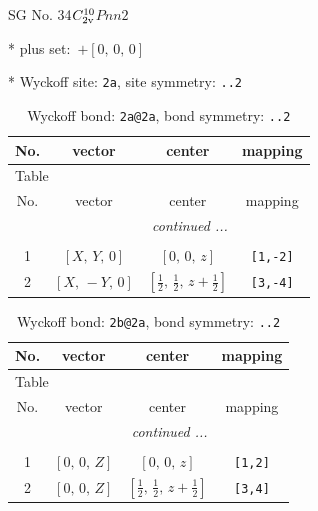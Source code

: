 \documentclass[fleqn,8pt]{jsarticle}
\begin{document}
\setcounter{MaxMatrixCols}{32}

\renewcommand{\tablename}{Table~}
\renewcommand{\figurename}{Figure~}
\begin{center}
\LARGE
SG No. 34\quad$C_{\rm 2v}^{10}$\quad$Pnn2$\quad[ orthorhombic ]
\end{center}

* plus set:\,\,\,$+\left[ 0,\, 0,\, 0 \right]$


* Wyckoff site: {\tt 2a}, site symmetry: {\tt ..2}
\renewcommand{\arraystretch}{1.2}
\begin{longtable}{cccc}
\caption{Wyckoff bond: {\tt 2a@2a}, bond symmetry: {\tt ..2}}
 \\
 \hline \hline
No. & vector & center & mapping \\ \hline \endfirsthead

\multicolumn{3}{l}{\tablename\ \thetable{}} \\
 \hline \hline
No. & vector & center & mapping \\ \hline \endhead

 \hline \hline
\multicolumn{3}{r}{\footnotesize\it continued ...} \\ \endfoot

 \hline \hline
\multicolumn{3}{r}{} \\ \endlastfoot

1 & $\left[ X,\, Y,\, 0 \right]$ & $\left[ 0,\, 0,\, z \right]$ & {\tt [1,-2]} \\ \hline
2 & $\left[ X,\, - Y,\, 0 \right]$ & $\left[ \frac{1}{2},\, \frac{1}{2},\, z + \frac{1}{2} \right]$ & {\tt [3,-4]} \\
\end{longtable}
\renewcommand{\arraystretch}{1.2}
\begin{longtable}{cccc}
\caption{Wyckoff bond: {\tt 2b@2a}, bond symmetry: {\tt ..2}}
 \\
 \hline \hline
No. & vector & center & mapping \\ \hline \endfirsthead

\multicolumn{3}{l}{\tablename\ \thetable{}} \\
 \hline \hline
No. & vector & center & mapping \\ \hline \endhead

 \hline \hline
\multicolumn{3}{r}{\footnotesize\it continued ...} \\ \endfoot

 \hline \hline
\multicolumn{3}{r}{} \\ \endlastfoot

1 & $\left[ 0,\, 0,\, Z \right]$ & $\left[ 0,\, 0,\, z \right]$ & {\tt [1,2]} \\ \hline
2 & $\left[ 0,\, 0,\, Z \right]$ & $\left[ \frac{1}{2},\, \frac{1}{2},\, z + \frac{1}{2} \right]$ & {\tt [3,4]} \\
\end{longtable}
\end{document}
